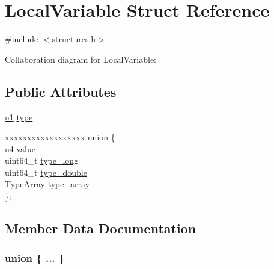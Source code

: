 \hypertarget{structLocalVariable}{}\section{Local\+Variable Struct Reference}
\label{structLocalVariable}


{\ttfamily \#include $<$structures.\+h$>$}



Collaboration diagram for Local\+Variable\+:
\subsection*{Public Attributes}
\begin{DoxyCompactItemize}
\item 
\hyperlink{structures_8h_a64f8055b64cf2a4c299c841130c5c938}{u1} \hyperlink{structLocalVariable_a05438f40d41a69cde0a4d50a37bf9420}{type}
\item 
\begin{tabbing}
xx\=xx\=xx\=xx\=xx\=xx\=xx\=xx\=xx\=\kill
union \{\\
\>\hyperlink{structures_8h_ae391a1d79bb0c8cbc283f0283e3c098b}{u4} \hyperlink{structLocalVariable_aee58138d840bf24f71cd8c4fd2f84db7}{value}\\
\>uint64\_t \hyperlink{structLocalVariable_af14e5709d8a7c9397571316821b9171b}{type\_long}\\
\>uint64\_t \hyperlink{structLocalVariable_a488dfde0ac92dbb3f2b4d56280771141}{type\_double}\\
\>\hyperlink{structTypeArray}{TypeArray} \hyperlink{structLocalVariable_a6905d4b07d1ff41deaa0189ae8761850}{type\_array}\\
\}; \\

\end{tabbing}\end{DoxyCompactItemize}


\subsection{Member Data Documentation}
\subsubsection[{\texorpdfstring{"@36}{@36}}]{\setlength{\rightskip}{0pt plus 5cm}union \{ ... \} }\hypertarget{structLocalVariable_a3570d34d2fed3081d2b7a21bb07cf290}{}\label{structLocalVariable_a3570d34d2fed3081d2b7a21bb07cf290}
